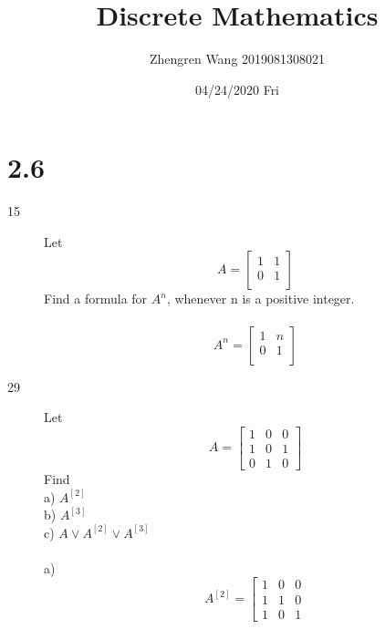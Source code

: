 \documentclass[UTF8]{article}
\title{Discrete Mathematics}
\author{Zhengren Wang 2019081308021}
\date{04/24/2020 Fri }
\begin{document}
\maketitle 

\part{2.6}
\begin{description}
    \item[15] Let
        \begin{equation} A=
            \left[
                \begin{array}{cc}
                    1 & 1 \\
                    0 & 1 \\
                \end{array}
            \right]
        \end{equation} Find a formula for $A^n$, whenever n is a positive integer.\\\\
        \begin{equation}
            A^{n}=
            \left[
                \begin{array}{cc}
                    1 & n\\
                    0 & 1\\
                \end{array}
            \right]
        \end{equation}
        \item[29]Let
		\begin{equation}
            A=
			\left[
			\begin{array}{ccc}
			1 & 0 & 0\\
			1 & 0 & 1\\
			0 & 1 & 0
			\end{array}
			\right]
		\end{equation}
		Find\\
		a) $A^{[2]}$\\
		b) $A^{[3]}$\\
		c) $A\lor A^{[2]}\lor A^{[3]}$\\\\
		a) 
		\begin{equation}
		A^{[2]}=
		\left[
		\begin{array}{ccc}
		1 & 0 & 0\\
		1 & 1 & 0\\
		1 & 0 & 1
		\end{array}

\end{equation}
\end{description}
\end{document}
